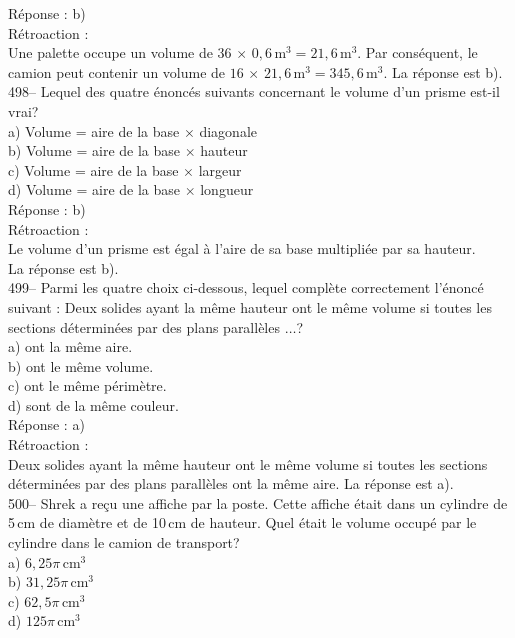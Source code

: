 ﻿\documentclass[letterpaper, 12pt]{article}
\begin{document}
R\'eponse : b)\\

R\'etroaction :\\
Une palette occupe un volume de $36\,\times\,0,6$\,m$^{3}=21,6$\,m$^{3}$.
Par cons\'equent, le camion peut contenir un volume de
$16\,\times\,21,6$\,m$^{3}=345,6$\,m$^{3}$.  La r\'eponse est b).\\

498-- Lequel des quatre \'enonc\'es suivants concernant le volume d'un
prisme est-il vrai?\\
a) Volume = aire de la base $\times$ diagonale\\
b) Volume = aire de la base $\times$ hauteur\\
c) Volume = aire de la base $\times$ largeur\\
d) Volume = aire de la base $\times$ longueur\\

R\'eponse : b)\\

R\'etroaction : \\
Le volume d'un prisme est \'egal \`a l'aire de sa base multipli\'ee par sa
hauteur.\\
La r\'eponse est b).\\

499-- Parmi les quatre choix ci-dessous, lequel compl\`ete
correctement l'\'enonc\'e suivant : \og Deux solides ayant la m\^eme
hauteur ont le m\^eme volume si toutes les sections d\'etermin\'ees
par des plans parall\`eles $\ldots$\fg ?\\
a) ont la m\^eme aire.\\
b) ont le m\^eme volume.\\
c) ont le m\^eme p\'erim\`etre.\\
d) sont de la m\^eme couleur.\\

R\'eponse : a)\\

R\'etroaction : \\
Deux solides ayant la m\^eme hauteur ont le m\^eme volume si toutes les
sections d\'etermin\'ees par des plans parall\`eles ont la m\^eme aire.  La
r\'eponse est a).\\

500-- Shrek a re\c cu une affiche par la poste.  Cette affiche \'etait dans
un cylindre de 5\,cm de diam\`etre et de 10\,cm de hauteur.  Quel \'etait le
volume occup\'e par le cylindre dans le camion de transport?\\
a) $6,25\pi$\,cm$^{3}$\\
b) $31,25\pi$\,cm$^{3}$\\
c) $62,5\pi$\,cm$^{3}$\\
d) $125\pi$\,cm$^{3}$\\
\end{document}

